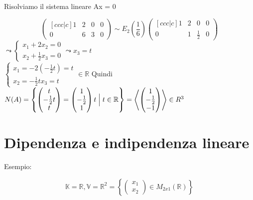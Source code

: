 \documentclass[12pt]{article}
\begin{document}
\begin{center}

    Risolviamo il sistema lineare Ax = 0

    \[\begin{pmatrix}[ccc|c]
        1 & 2 & 0 & 0\\
        0 & 6 & 3 & 0
    \end{pmatrix} \sim E_{2}\left(\frac{1}{6}\right) \begin{pmatrix}[ccc|c]
        1 & 2 & 0 & 0\\
        0 & 1 & \frac{1}{2} & 0
    \end{pmatrix}\]
    $\leadsto \begin{cases}
        x_1 + 2x_2 = 0\\
        x_2 + \frac{1}{2}x_3 = 0
    \end{cases} \leadsto x_3 = t$\\
    $\begin{cases}
        x_1 = -2(-\frac{1}{2}t) = t\\
        x_2 =  -\frac{1}{2}t
        x_3 = t
    \end{cases} \in \mathbb{R}$
    Quindi $N(A) = \left\{ \begin{pmatrix}
        t\\
        -\frac{1}{2}t\\
        t
    \end{pmatrix} = \begin{pmatrix}
        1\\
        -\frac{1}{2}\\
        1
    \end{pmatrix}t \Bigm\vert t \in \mathbb{R}\right\} =
    \left<\begin{pmatrix}
        1\\
        -\frac{1}{2}\\
        -1
    \end{pmatrix}\right> \in R^3$
\end{center}

\pagebreak

\section{Dipendenza e indipendenza lineare}

Esempio:

\[\mathbb{K} = \mathbb{R}, \mathbb{V} = \mathbb{R}^2 =
\left\{\begin{pmatrix}
    x_1\\
    x_2
\end{pmatrix} \in M_{2x1} (\mathbb{R})\right\}\]
\end{document}
